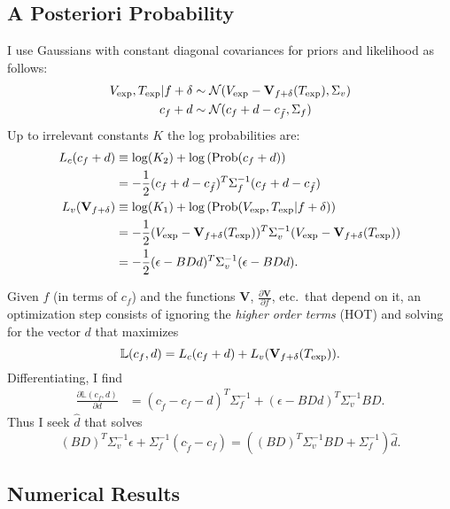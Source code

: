 \documentclass[11pt]{article}
\newcommand{\normal}[2]{{\cal N}(#1,#2)}
\newcommand{\normalexp}[3]{ -\frac{1}{2}
      (#1 - #2)^T #3^{-1} (#1 - #2) }
\newcommand{\fnom}{\tilde f}
\newcommand{\Prob}{\text{Prob}}
\newcommand{\partiald}[2]{\frac{\partial #1}{\partial #2}}
\newcommand\Vt{\mathbf{V}}
\newcommand\vexp{V_{\rm{exp}}}
\newcommand\texp{T_{\rm{exp}}}
\newcommand\cf{c_f}
\newcommand\DVDf{\partiald{\Vt}{f}}
\newcommand\Lbb{\mathbb{L}}
\begin{document}
\subsection{A Posteriori Probability}
\label{sec:app}

I use Gaussians with constant diagonal covariances for priors and
likelihood as follows:
\begin{align}
\vexp,\texp | f+\delta &\sim
\normal{\vexp-\Vt_{f+\delta}(\texp)}{\Sigma_v} \\
\cf+d &\sim \normal{\cf+d - c_{\fnom}}{\Sigma_f}
\end{align}
Up to irrelevant constants $K$ the log probabilities are:
\begin{align}
  L_c(\cf+d) & \equiv \log(K_2) + \log \left(\Prob(\cf+d) \right)\\
  & = \normalexp{\cf+d}{c_{\fnom}}{\Sigma_f}\\
  L_v(\Vt_{f+\delta}) & \equiv \log(K_1) + \log
  \left(\Prob(\vexp,\texp | f+\delta) \right)
  \nonumber \\
  & = \normalexp{\vexp}{\Vt_{f+\delta}(\texp)}{\Sigma_v} \\
  &= \normalexp{\epsilon}{BDd}{\Sigma_v}.
\end{align}

Given $f$ (in terms of $\cf$) and the functions $\Vt$, $\DVDf$, etc.\
that depend on it, an optimization step consists of ignoring the
\emph{higher order terms} (HOT) and solving for the vector $d$ that
maximizes
\begin{equation}
  \label{eq:L}
  \Lbb(\cf,d) = L_c(\cf + d) + L_v(\Vt_{f+\delta}(\texp)).
\end{equation}
Differentiating, I find
\begin{align*}
  \partiald{\Lbb(\cf,d)}{d} &= (c_{\fnom} - \cf - d)^T
  \Sigma^{-1}_f + (\epsilon - BDd)^T \Sigma_v^{-1}BD.
\end{align*}
Thus I seek $\hat d$ that solves
\begin{equation}
  \label{eq:dmap}
  (BD)^T\Sigma_v^{-1}\epsilon + \Sigma_f^{-1} (c_{\tilde f} - \cf) = 
  \left((BD)^T\Sigma_v^{-1}BD + \Sigma_f^{-1} \right) \hat d.
\end{equation}
\subsection{Numerical Results}
\label{sec:numerical-results}
\end{document}
